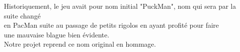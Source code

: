 \documentclass [twoside,a4paper,11pt,french] {report}
\begin{document}
{
    \parskip=0pt
    \tableofcontents
}
\begin{center}
    Historiquement, le jeu avait pour nom initial "PuckMan", nom qui sera par la suite changé \\
    en PacMan suite au passage de petits rigolos en ayant profité pour faire\\
    une mauvaise blague bien évidente.
    ~ \\
    Notre projet reprend ce nom original en hommage.
\end{center}

\cleardoublepage

\end{document}
